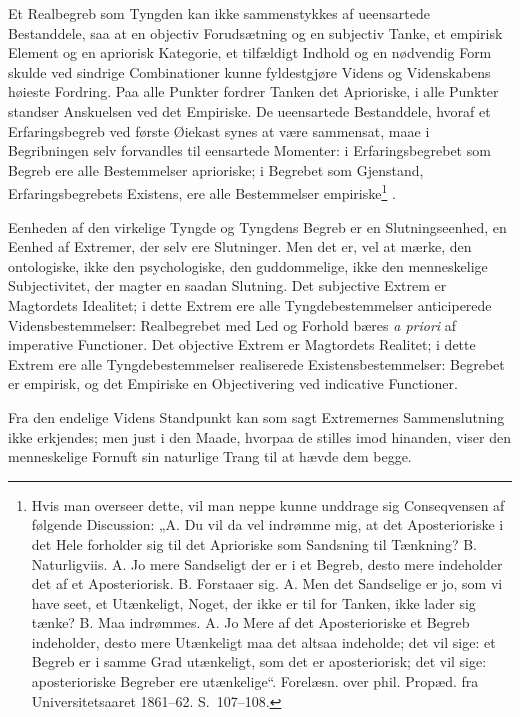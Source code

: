 \documentclass[12pt]{book}
\newcommand{\opage}[1]{\marginnote{\footnotesize\textit{[#1]}}}
\begin{document}
Et Realbegreb som Tyngden kan ikke sammenstykkes af ueensartede Bestanddele, saa at en objectiv Forudsætning og en subjectiv Tanke, et empirisk Element og en apriorisk
\opage{412}Kategorie, et tilfældigt Indhold og en nødvendig Form skulde ved sindrige Combinationer kunne fyldestgjøre Videns og Videnskabens høieste Fordring. Paa alle Punkter fordrer Tanken det Aprioriske, i alle Punkter standser Anskuelsen ved det Empiriske. De ueensartede Bestanddele, hvoraf et Erfaringsbegreb ved første Øiekast synes at være sammensat, maae i Begribningen selv forvandles til eensartede Momenter: i Erfaringsbegrebet som Begreb ere alle Bestemmelser aprioriske; i Begrebet som Gjenstand, Erfaringsbegrebets Existens, ere alle Bestemmelser empiriske\footnote{Hvis man overseer dette, vil man neppe kunne unddrage sig Conseqvensen af følgende Discussion: „A. Du vil da vel indrømme mig, at det Aposterioriske i det Hele forholder sig til det Aprioriske som Sandsning til Tænkning? B. Naturligviis. A. Jo mere Sandseligt der er i et Begreb, desto mere indeholder det af et Aposteriorisk. B. Forstaaer sig. A. Men det Sandselige er jo, som vi have seet, et Utænkeligt, Noget, der ikke er til for Tanken, ikke lader sig tænke? B. Maa indrømmes. A. Jo Mere af det Aposterioriske et Begreb indeholder, desto mere Utænkeligt maa det altsaa indeholde; det vil sige: et Begreb er i samme Grad utænkeligt, som det er aposteriorisk; det vil sige: aposterioriske Begreber ere utænkelige“. Forelæsn. over phil. Propæd. fra Universitetsaaret 1861--62. S.~107--108.}%
.

Eenheden af den virkelige Tyngde og Tyngdens Begreb er en Slutningseenhed, en Eenhed af Extremer, der selv ere Slutninger. Men det er, vel at mærke, den ontologiske, ikke den psychologiske, den guddommelige, ikke den menneskelige Subjectivitet, der magter en saadan Slutning. Det subjective Extrem er Magtordets Idealitet; i dette Extrem ere alle Tyngdebestemmelser anticiperede Vidensbestemmelser: Realbegrebet med Led og Forhold bæres \textit{a priori} af imperative Functioner. Det objective Extrem er Magtordets Realitet; i dette Extrem ere alle Tyngdebestemmelser realiserede Existensbestemmelser: Begrebet er empirisk, og det Empiriske en Objectivering ved indicative Functioner.

\opage{413}Fra den endelige Videns Standpunkt kan som sagt Extremernes Sammenslutning ikke erkjendes; men just i den Maade, hvorpaa de stilles imod hinanden, viser den menneskelige Fornuft sin naturlige Trang til at hævde dem begge.
\end{document}
